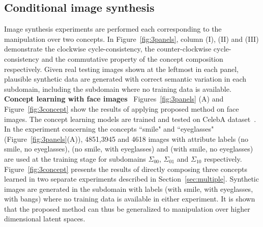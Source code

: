 \documentclass[10pt,twocolumn,letterpaper]{article}
\begin{document}


\subsection{Conditional image synthesis} \label{experiments}
Image synthesis experiments are performed each corresponding to the manipulation over two concepts. In Figure~\ref{fig:3panels}, column (I), (II) and (III) demonstrate the clockwise cycle-consistency, the counter-clockwise cycle-consistency and the commutative property of the concept composition respectively. Given real testing images shown at the leftmost in each panel, plausible synthetic data are generated with correct semantic variation in each subdomain, including the subdomain where no training data is available.
\\\textbf{Concept learning with face images}  ~Figures~\ref{fig:3panels} (A) and Figure~\ref{fig:3concept} show the results of applying proposed method on face images. The concept learning models are trained and tested on CelebA dataset~\cite{celebA}. In the experiment concerning the concepts ``smile" and ``eyeglasses" (Figure~\ref{fig:3panels}(A)), 4851,3945 and 4618 images with attribute labels (no smile, no eyeglasses), (no smile, with eyeglasses) and (with smile, no eyeglasses) are used at the training stage for subdomains $\Sigma_{00}$, $\Sigma_{01}$ and $\Sigma_{10}$ respectively. %
Figure~\ref{fig:3concept} presents the results of directly composing three concepts learned in two separate experiments described in Section~\ref{sec:multiple}. Synthetic images are generated in the subdomain with labels (with smile, with eyeglasses, with bangs) where no training data is available in either experiment. It is shown that the proposed method can thus be generalized to manipulation over higher dimensional latent spaces.
\end{document}
